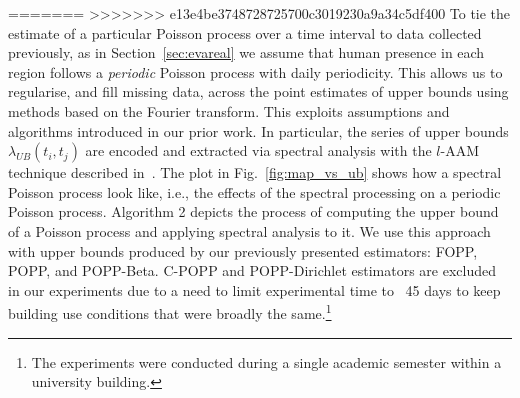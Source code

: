 =======
>>>>>>> e13e4be3748728725700c3019230a9a34c5df400
To tie the estimate of a particular Poisson process over a time interval to data collected previously, as in Section~\ref{sec:evareal} we assume that human presence in each region follows a \emph{periodic} Poisson process with daily periodicity. This allows us to regularise, and fill missing data, across the point estimates of upper bounds using methods based on the Fourier transform.  This exploits assumptions and algorithms introduced in our prior work. In particular, the series of upper bounds $\lambda_{UB}(t_i, t_j)$ are encoded and extracted via spectral analysis with the $l$-AAM technique described in~\cite{jovan_iros16}. The plot in Fig.~\ref{fig:map_vs_ub} shows how a spectral Poisson process look like, i.e., the effects of the spectral processing on a periodic Poisson process. Algorithm 2 depicts the process of computing the upper bound of a Poisson process and applying spectral analysis to it. We use this approach with upper bounds produced by our previously presented estimators: FOPP, POPP, and POPP-Beta. C-POPP and POPP-Dirichlet estimators are excluded in our experiments due to a need to limit experimental time to ~45 days to keep building use conditions that were broadly the same.\footnote{The experiments were conducted during a single academic semester within a university building.}

